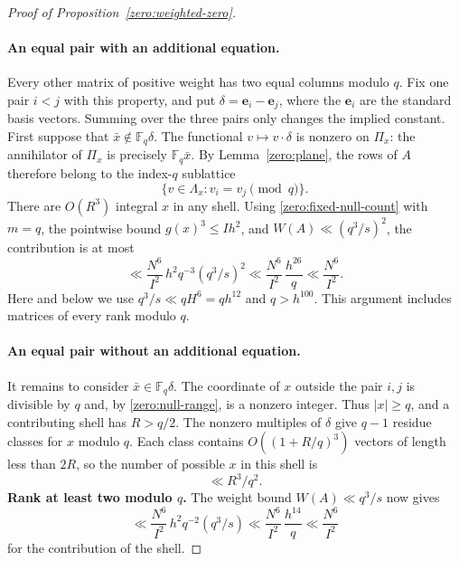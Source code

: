 \begin{proof}[Proof of Proposition~\ref{zero:weighted-zero}]
\paragraph{An equal pair with an additional equation.}
Every other matrix of positive weight has two equal columns
modulo $q$.  Fix one pair $i<j$ with this property, and put
$\delta=\mathbf e_i-\mathbf e_j$, where the $\mathbf e_i$ are the
standard basis vectors.  Summing over the three pairs only
changes the implied constant.  First suppose that
$\bar x\notin\mathbb F_q\delta$.
The functional $v\mapsto v\cdot\delta$ is nonzero on $\Pi_x$:
the annihilator of $\Pi_x$ is precisely $\mathbb F_q\bar x$.
By Lemma~\ref{zero:plane}, the rows of $A$ therefore belong to
the index-$q$ sublattice
\[
 \{v\in\Lambda_x:v_i=v_j\pmod q\}.
\]
There are $O(R^3)$ integral $x$ in any shell.  Using
\eqref{zero:fixed-null-count} with $m=q$, the pointwise bound
$g(x)^3\le Ih^2$, and $W(A)\ll(q^3/s)^2$, the contribution is at most
\begin{equation}\label{zero:equal-additional}
 \ll \frac{N^6}{I^2}\,h^2q^{-3}(q^3/s)^2
 \ll \frac{N^6}{I^2}\,\frac{h^{26}}q
 \ll \frac{N^6}{I^2}.
\end{equation}
Here and below we use $q^3/s\ll qH^6=qh^{12}$ and $q>h^{100}$.
This argument includes matrices of every rank modulo $q$.

\paragraph{An equal pair without an additional equation.}
It remains to consider $\bar x\in\mathbb F_q\delta$.
The coordinate of $x$ outside the pair $i,j$ is divisible by
$q$ and, by \eqref{zero:null-range}, is a nonzero integer.
Thus $|x|\ge q$, and a contributing shell has $R>q/2$.
The nonzero multiples of $\delta$ give $q-1$ residue classes
for $x$ modulo $q$.  Each class contains
$O((1+R/q)^3)$ vectors of length less than $2R$, so the number
of possible $x$ in this shell is
\begin{equation}\label{zero:special-normals}
 \ll R^3/q^2.
\end{equation}
\smallskip
\noindent\textbf{Rank at least two modulo $q$.}
The weight bound
$W(A)\ll q^3/s$ now gives
\begin{equation}\label{zero:special-rank-two}
 \ll \frac{N^6}{I^2}\,h^2q^{-2}(q^3/s)
 \ll \frac{N^6}{I^2}\,\frac{h^{14}}q
 \ll \frac{N^6}{I^2}
\end{equation}
for the contribution of the shell.


\end{proof}
